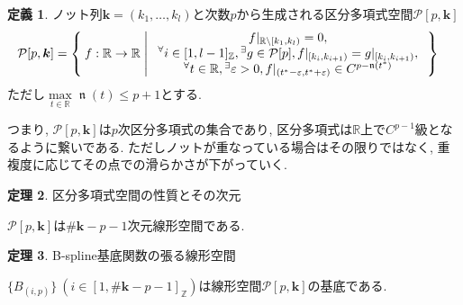 \documentclass{jsarticle}
\newcommand\setR{\mathbb{R}}
\newcommand\subknot[1]{{#1}^*}
\newcommand\curl[1]{\{#1\}}
\newcommand\squa[1]{[#1]}
\newcommand\E[1]{\!\,{\vphantom{#1}}^\exists #1}
\newcommand\A[1]{\!\,{\vphantom{#1}}^\forall #1}
\newcommand\Z[2]{\squa{#1,#2}_\mathbb{Z}}
\DeclareMathOperator{\supp}{supp}
\DeclareMathOperator{\N}{\mathfrak{n}}
\theoremstyle{definition}%
\newtheorem{thm}{定理}
\newtheorem{defn}[thm]{定義}
\newcommand\UC{\textcolor{red}{(執筆中です)}}
\begin{document}
\begin{screen}
	\begin{defn}
        \label{Def305}
		ノット列$\bm{k}=(k_1,\dots,k_l)$と次数$p$から生成される区分多項式空間$\mathcal{P}[p, \bm{k}]$
		\begin{align}
			\mathcal{P}[p, \bm{k}]
			&=\Set{
				f:\setR\to\setR |
				\begin{array}{c}
					f|_{\mathbb{R}\backslash[k_1,k_l)}=0, \\
					\A i\in\Z{1}{l-1}, \E g\in \mathcal{P}[p], f|_{[k_{i},k_{i+1})}=g|_{[k_{i},k_{i+1})}, \\
					\A t\in\setR, \E \varepsilon>0, f|_{(t^*-\varepsilon,t^*+\varepsilon)}\in C^{p-\N(t^*)}
				\end{array}
			}
		\end{align}
		ただし$\max\limits_{t\in\setR}\N(t)\le p+1$とする.
	\end{defn}
\end{screen}
つまり, $\mathcal{P}[p, \bm{k}]$は$p$次区分多項式の集合であり, 区分多項式は$\mathbb{R}$上で$C^{p-1}$級となるように繋いである.
ただしノットが重なっている場合はその限りではなく, 重複度に応じてその点での滑らかさが下がっていく.


\begin{screen}
	\begin{thm}
		\label{Thm308}
		区分多項式空間の性質とその次元

		$\mathcal{P}[p, \bm{k}]$は$\#{\bm{k}}-p-1$次元線形空間である.
	\end{thm}
\end{screen}


\begin{screen}
	\begin{thm}
		B-spline基底関数の張る線形空間

		$\curl{B_{(i,p)}} \ (i\in \Z{1}{\#{\bm{k}}-p-1})$は線形空間$\mathcal{P}[p, \bm{k}]$の基底である.
	\end{thm}
\end{screen}

\end{document}
